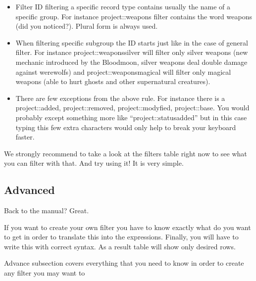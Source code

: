 \begin{itemize}
 \item Filter ID filtering a specific record type contains usually the name of a specific group. For instance project::weapons filter
 contains the word weapons (did you noticed?). Plural form is always used.
 \item When filtering specific subgroup the ID starts just like in the case of general filter. For instance project::weaponssilver will
 filter only silver weapons (new mechanic introduced by the Bloodmoon, silver weapons deal double damage against werewolfs) and 
 project::weaponsmagical will filter only magical weapons (able to hurt ghosts and other supernatural creatures).
 \item There are few exceptions from the above rule. For instance there is a project::added, project::removed, project::modyfied, project::base.
 You would probably except something more like ``project::statusadded'' but in this case typing this few extra characters would only
 help to break your keyboard faster.
\end{itemize}

We strongly recommend to take a look at the filters table right now to see what you can filter with that. And try using it! It is very simple.

\subsection{Advanced}
Back to the manual? Great.

If you want to create your own filter you have to know exactly what do you want to get in order to translate this into the expressions.
Finally, you will have to write this with correct syntax. As a result table will show only desired rows.

Advance subsection covers everything that you need to know in order to create any filter you may want to %
